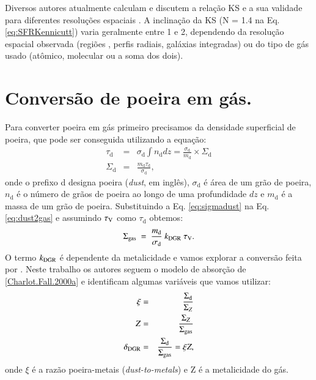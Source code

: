 Diversos autores atualmente calculam e discutem a relação KS e a sua validade para diferentes
resoluções espaciais \citep[e.g., ][]{Kennicutt.etal.2007a, Leroy.etal.2012a,
Calzetti.Liu.Koda.2012a, Lada.etal.2013a, Tacconi.etal.2013a, Casasola.etal.2015a}. A inclinação
da KS (N = 1.4 na Eq. \ref{eq:SFRKennicutt}) varia geralmente entre 1 e 2, dependendo da resolução
espacial observada (regiões \Hii, perfis radiais, galáxias integradas) ou do tipo de gás usado
(atômico, molecular ou a soma dos dois).

\section{Conversão de poeira em gás.}
\label{sec:gasfrac:gas2dust}

Para converter poeira em gás primeiro precisamos da densidade superficial de poeira, que pode ser
conseguida utilizando a equação:
\begin{eqnarray}
	\tau_{\mathrm{d}} &=& \sigma_{\mathrm{d}} \int n_{\mathrm{d}} dz =
	\frac{\sigma_{\mathrm{d}}}{m_{\mathrm{d}}}\times\Sigma_{\mathrm{d}}
	\\
	\Sigma_{\mathrm{d}} &=& \frac{m_{\mathrm{d}} \tau_{\mathrm{d}}}{\sigma_{\mathrm{d}}},
	\label{eq:sigmadust}
\end{eqnarray}
\noindent onde o prefixo d designa poeira ({\em dust}, em inglês), $\sigma_{\mathrm{d}}$ é área de
um grão de poeira, $n_{\mathrm{d}}$ é o número de grãos de poeira ao longo de uma profundidade
$dz$ e $m_{\mathrm{d}}$ é a massa de um grão de poeira. Substituindo a Eq. \ref{eq:sigmadust} na Eq. 
\ref{eq:dust2gas} e assumindo $\tau_{\mathrm{V}}$ como $\tau_{\mathrm{d}}$ obtemos:
\begin{equation}
	\SigmaGas\ =\ \frac{m_{\mathrm{d}}}{\sigma_{\mathrm{d}}}\ \deltaDGR\ \tauV. 
	\label{eq:dust2gas_tauV}
\end{equation}
O termo $k_{\mathrm{DGR}}$ é dependente da metalicidade e vamos explorar a conversão feita por
\citet{Brinchmann.etal.2013a}. Neste trabalho os autores seguem o modelo de absorção de
\ref{Charlot.Fall.2000a} e identificam algumas variáveis que vamos utilizar:
\begin{eqnarray}
	\xi &=& \frac{\Sigma_{\mathrm{d}}}{\Sigma_Z} \\
	Z &=& \frac{\Sigma_Z}{\Sigma_{\mathrm{gas}}}  \\
	\delta_{\mathrm{DGR}} &=& \frac{\Sigma_{\mathrm{d}}}{\Sigma_{\mathrm{gas}}} = \xi Z, 
	\label{eq:deltaDGR}
\end{eqnarray}
\noindent onde $\xi$ é a razão poeira-metais ({\em dust-to-metals}) e Z é a metalicidade do gás.

